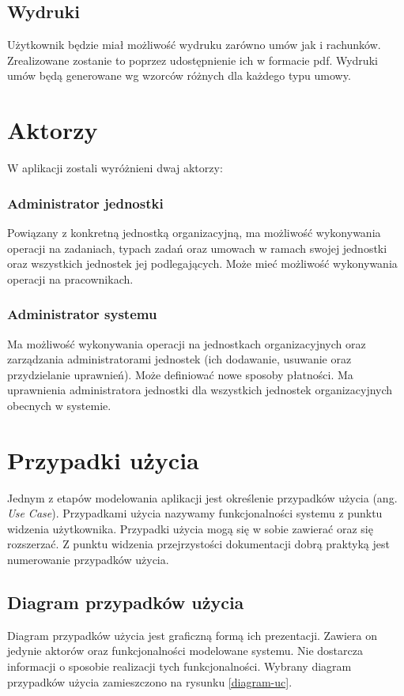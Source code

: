 \subsection[Wydruki][Wydruki]{Wydruki}
Użytkownik będzie miał możliwość wydruku zarówno umów jak i rachunków. Zrealizowane zostanie to poprzez udostępnienie ich w formacie pdf. Wydruki umów będą generowane wg wzorców różnych dla każdego typu umowy.

\section[Aktorzy][Aktorzy]{Aktorzy}
W aplikacji zostali wyróżnieni dwaj aktorzy:

\subsubsection{Administrator jednostki}
Powiązany z konkretną jednostką organizacyjną, ma możliwość wykonywania operacji na zadaniach, typach zadań oraz umowach w ramach swojej jednostki oraz wszystkich jednostek jej podlegających. Może mieć możliwość wykonywania operacji na pracownikach.

\subsubsection{Administrator systemu}
Ma możliwość wykonywania operacji na jednostkach organizacyjnych oraz zarządzania administratorami jednostek (ich dodawanie, usuwanie oraz przydzielanie uprawnień). Może definiować nowe sposoby płatności. Ma uprawnienia administratora jednostki dla wszystkich jednostek organizacyjnych obecnych w systemie.

\section[Przypadki użycia][Przypadki użycia]{Przypadki użycia}
Jednym z etapów modelowania aplikacji jest określenie przypadków użycia (ang. \textit{Use Case}). Przypadkami użycia nazywamy funkcjonalności systemu z punktu widzenia użytkownika. Przypadki użycia mogą się w sobie zawierać oraz się rozszerzać. Z punktu widzenia przejrzystości dokumentacji dobrą praktyką jest numerowanie przypadków użycia.

\subsection[Diagram przypadków użycia][Diagram przypadków użycia]{Diagram przypadków użycia}
Diagram przypadków użycia jest graficzną formą ich prezentacji. Zawiera on jedynie aktorów oraz funkcjonalności modelowane systemu. Nie dostarcza informacji o sposobie realizacji tych funkcjonalności. Wybrany diagram przypadków użycia zamieszczono na rysunku \ref{diagram-uc}.


